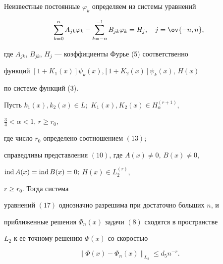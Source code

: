 Неизвестные постоянные $\varphi_k$ определяем из системы уравнений 


\begin{equation} 


\sum^n_{k=0}A_{jk}\varphi_k-\sum^{-1}_{k=-n} 


B_{jk}\varphi_k=H_j,\quad j=\ov{-n,n}, 


\end{equation} 


где $A_{jk}$, $B_{jk}$, $H_j$ --- коэффициенты Фурье (5) соответственно 


функций $[1+K_1(x)]\psi_k(x)$,\linebreak $[1+K_2(x)]\psi_k(x)$, $H(x)$


по системе функций (3). 


 


\begin{thm} 


Пусть $k_1(x),k_2(x)\in L;$ $K_1(x),K_2(x)\in H^{(r+1)}_\alpha$, 


$\frac{3}{4}<\alpha<1$, $r\ge r_0$, 


где число $r_0$ определено соотношением $(13);$ 


справедливы представления $(10)$, где $A(x)\ne 0$, $B(x)\ne 0$, 


$\operatorname{ind} A(x)=\operatorname{ind} B(x)=0;$ $H(x)\in L^{(r)}_2$, 


$r\ge r_0$. Тогда система 


уравнений $(17)$ однозначно разрешима при достаточно больших $n$, и 


приближенные решения $\Phi_n(x)$ задачи $(8)$ сходятся в пространстве 


$L_2$ к ее точному решению $\Phi(x)$ со скоростью 


\begin{equation} 


\|\Phi(x)-\Phi_n(x)\|_{L_2}\le d_5n^{-r}. 


\end{equation} 


\end{thm} 


 


